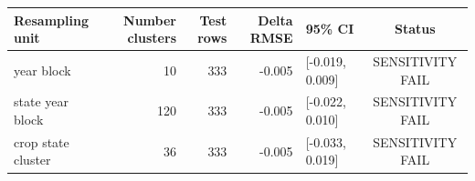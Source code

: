\begin{tabular}{lrrrlc}
\toprule
Resampling unit & Number clusters & Test rows & Delta RMSE & 95\% CI & Status \\
\midrule
year block & 10 & 333 & -0.005 & [-0.019, 0.009] & SENSITIVITY FAIL \\
state year block & 120 & 333 & -0.005 & [-0.022, 0.010] & SENSITIVITY FAIL \\
crop state cluster & 36 & 333 & -0.005 & [-0.033, 0.019] & SENSITIVITY FAIL \\
\bottomrule
\end{tabular}
